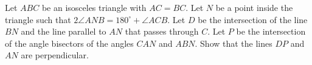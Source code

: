 \problem
Let $ABC$ be an isosceles triangle with $AC = BC$.
Let $N$ be a point inside the triangle such that $2 \angle ANB = 180^\circ + \angle ACB$.
Let $D$ be the intersection of the line $BN$ and the line parallel to $AN$ that passes through $C$.
Let $P$ be the intersection of the angle bisectors of the angles $CAN$ and $ABN$.
Show that the lines $DP$ and $AN$ are perpendicular.
\solution
\endproblem
